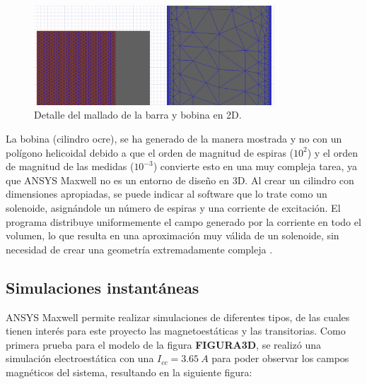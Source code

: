 \begin{itemize}
\begin{figure}[H]
        \label{fig:BarGeomMesh} %
    \end{figure}
    \begin{figure}[H]
        \centering
        \includegraphics[width=9cm]{FigurasMemoria/BarMeshDetail.png}
        \caption{Detalle del mallado de la barra y bobina en 2D.}
        \label{fig:GeomMeshDetail} %
    \end{figure}
\end{itemize}

La bobina (cilindro ocre), se ha generado de la manera mostrada y no con un polígono helicoidal debido a que el orden de magnitud de espiras (\(10^2\)) y el orden de magnitud de las medidas (\(10^{-3}\)) convierte esto en una muy compleja tarea, ya que ANSYS Maxwell no es un entorno de diseño en 3D. Al crear un cilindro con dimensiones apropiadas, se puede indicar al software que lo trate como un solenoide, asignándole un número de espiras y una corriente de excitación. El programa distribuye uniformemente el campo generado por la corriente en todo el volumen, lo que resulta en una aproximación muy válida de un solenoide, sin necesidad de crear una geometría extremadamente compleja \citep[p. 13]{ansoft2012maxwell}.

\subsection{Simulaciones instantáneas}
ANSYS Maxwell permite realizar simulaciones de diferentes tipos, de las cuales tienen interés para este proyecto las magnetoestáticas y las transitorias. Como primera prueba para el modelo de la figura \textbf{FIGURA3D}, se realizó una simulación electroestática con una \(I_{cc}=3.65~A\) para poder observar los campos magnéticos del sistema, resultando en la siguiente figura:

